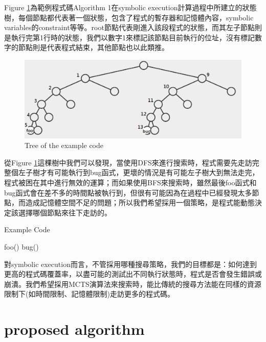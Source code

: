 \documentclass[12pt,a4paper,oneside]{book}
\begin{document}
Figure \ref{figTREE}為範例程式碼Algorithm 1在symbolic execution計算過程中所建立的狀態樹，每個節點都代表著一個狀態，包含了程式的暫存器和記憶體內容，symbolic variables的constraint等等。root節點代表剛進入該段程式的狀態，而其左子節點則是執行完第1行時的狀態，我們以數字1來標記該節點目前執行的位址，沒有標記數字的節點則是代表程式結束，其他節點也以此類推。

\begin{figure}[htbp]
\center
\includegraphics[width=\textwidth]{figures/tree.png}
\caption{Tree of the example code \label{figTREE}}
\end{figure}

從Figure \ref{figTREE}這棵樹中我們可以發現，當使用DFS來進行搜索時，程式需要先走訪完整個左子樹才有可能執行到bug函式，更壞的情況是有可能左子樹大到無法走完，程式被困在其中進行無效的運算；而如果使用BFS來搜索時，雖然最後foo函式和bug函式會在差不多的時間點被執行到，但很有可能因為在過程中已經發現太多節點，而造成記憶體空間不足的問題；所以我們希望採用一個策略，是程式能動態決定該選擇哪個節點來往下走訪的。

\newpage

\begin{algorithm}[htbp]
  \caption{Example Code}
  \begin{algorithmic}[1]
                	\State foo()
                \EndIf
            \EndIf
        \EndIf
    \Else
                	\State bug()
                \EndIf
            \EndIf
        \EndIf
    \EndIf
  \end{algorithmic}
\end{algorithm}

對symbolic execution而言，不管採用哪種搜尋策略，我們的目標都是：如何達到更高的程式碼覆蓋率，以盡可能的測試出不同執行狀態時，程式是否會發生錯誤或崩潰。我們希望採用MCTS演算法來搜索時，能比傳統的搜尋方法能在同樣的資源限制下(如時間限制、記憶體限制)走訪更多的程式碼。

\section{proposed algorithm}
\end{document}
